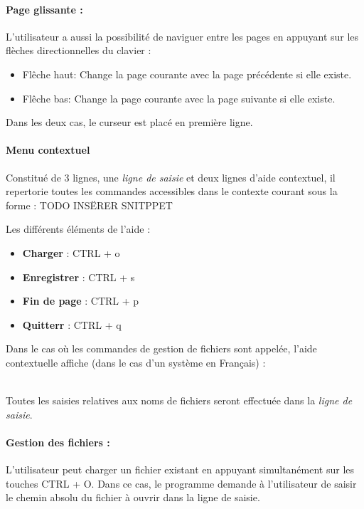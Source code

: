 \paragraph{Page glissante :}
L'utilisateur a aussi la possibilité de naviguer entre les pages en appuyant sur les flèches directionnelles du clavier :
\begin{itemize}
	\item \og Flêche haut\fg : Change la page courante avec la page précédente si elle existe.
	\item \og Flêche bas\fg : Change la page courante avec la page suivante si elle existe.
\end{itemize}
Dans les deux cas, le curseur est placé en première ligne.

\paragraph{Menu contextuel}
Constitué de 3 lignes, une \textsl{ligne de saisie} et deux lignes d'aide contextuel, il repertorie toutes les commandes accessibles dans le contexte courant sous la forme :
TODO INSËRER SNITPPET

Les différents éléments de l'aide :
\begin{itemize}
	\item \textbf{Charger} : \og CTRL + o\fg
	\item \textbf{Enregistrer} : \og CTRL + s\fg
	\item \textbf{Fin de page} : \og CTRL + p\fg
	\item \textbf{Quitterr} : \og CTRL + q\fg
\end{itemize}

Dans le cas où les commandes de gestion de fichiers sont appelée, l'aide contextuelle affiche (dans le cas d'un système en Français) :\\
\begin{center}
\end{center}
~\\
Toutes les saisies relatives aux noms de fichiers seront effectuée dans la \textsl{ligne de saisie}.

\paragraph{Gestion des fichiers :}
L'utilisateur peut charger un fichier existant en appuyant simultanément sur les touches \og CTRL + O\fg. Dans ce cas, le programme demande à l'utilisateur de saisir le chemin absolu du fichier à ouvrir dans la ligne de saisie.

